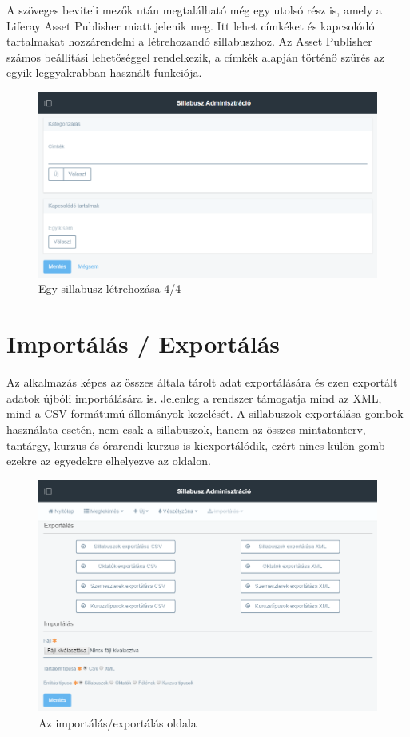 \documentclass[hidelinks, 12pt, a4paper]{report}
\begin{document}
A szöveges beviteli mezők után megtalálható még egy utolsó rész is, amely a Liferay Asset Publisher miatt jelenik meg. Itt lehet címkéket és kapcsolódó tartalmakat hozzárendelni a létrehozandó sillabuszhoz. Az Asset Publisher számos beállítási lehetőséggel rendelkezik, a címkék alapján történő szűrés az egyik leggyakrabban használt funkciója.

\begin{figure}[H]
    \centering
	\includegraphics[width=\textwidth]{sm_syllabus_add_4.png}
	\caption{Egy sillabusz létrehozása 4/4}
\end{figure}

\section{Importálás / Exportálás}

Az alkalmazás képes az összes általa tárolt adat exportálására és ezen exportált adatok újbóli importálására is. Jelenleg a rendszer támogatja mind az XML, mind a CSV formátumú állományok kezelését. A sillabuszok exportálása gombok használata esetén, nem csak a sillabuszok, hanem az összes mintatanterv, tantárgy, kurzus és órarendi kurzus is kiexportálódik, ezért nincs külön gomb ezekre az egyedekre elhelyezve az oldalon.

\begin{figure}[H]
    \centering
	\includegraphics[width=\textwidth]{sm_import_export.png}
	\caption{Az importálás/exportálás oldala}
\end{figure}
\end{document}
